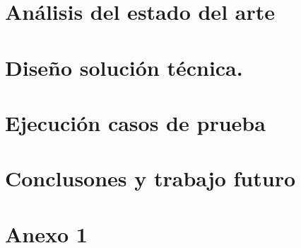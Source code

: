 \documentclass[12pt, a4paper]{book}
\begin{document}

\setmainfont{Carlito}
\frontmatter 


\tableofcontents	%
\listoffigures		%
\listoftables		%
\listofcodes	    %
\cleardoublepage

\mainmatter
\pagestyle{fancy}



\chapter{Análisis del estado del arte}
 
 
\chapter{Diseño solución técnica.}


\chapter{Ejecución casos de prueba}


\chapter{Conclusones y trabajo futuro}

\newpage

\appendix
\chapter{Anexo 1}
\lipsum[1-2]

\cleardoublepage
\thispagestyle{empty}

% 

 

\glsaddall
\printglossary[title=Glosario,toctitle=Glosario]
\end{document}
